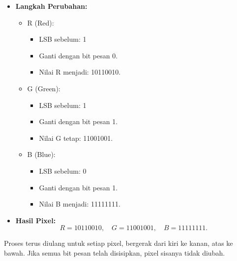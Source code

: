 \documentclass{ittelkom}
\begin{document}
\begin{enumerate}
\begin{enumerate}
\begin{itemize}
                        \item \textbf{Langkah Perubahan:}
                              \begin{itemize}
                                  \item R (Red):
                                        \begin{itemize}
                                            \item LSB sebelum: 1
                                            \item Ganti dengan bit pesan 0.
                                            \item Nilai R menjadi: 10110010.
                                        \end{itemize}
                                  \item G (Green):
                                        \begin{itemize}
                                            \item LSB sebelum: 1
                                            \item Ganti dengan bit pesan 1.
                                            \item Nilai G tetap: 11001001.
                                        \end{itemize}
                                  \item B (Blue):
                                        \begin{itemize}
                                            \item LSB sebelum: 0
                                            \item Ganti dengan bit pesan 1.
                                            \item Nilai B menjadi: 11111111.
                                        \end{itemize}
                              \end{itemize}

                        \item \textbf{Hasil Pixel:}
                              \[
                                  R = 10110010, \quad G = 11001001, \quad B = 11111111.
                              \]
                    \end{itemize}

                    Proses terus diulang untuk setiap pixel, bergerak dari kiri ke kanan, atas ke
                    bawah. Jika semua bit pesan telah disisipkan, pixel sisanya tidak diubah.


\end{enumerate}
\end{enumerate}
\end{document}
